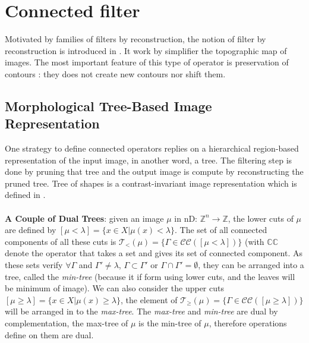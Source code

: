 \section{Connected filter}
Motivated by families of filters by reconstruction, the notion of filter by reconstruction is introduced in \cite{Salembier95flatzones} \cite{Serra1993}. It work by simplifier the topographic map of images. The most important feature of this type of operator is preservation of contours \cite{Salembier2009}: they does not create new contours nor shift them.
\subsection{Morphological Tree-Based Image Representation}
One strategy to define connected operators replies on a hierarchical region-based representation of the input image, in another word, a tree. The filtering step is done by pruning that tree and the output image is compute by reconstructing the pruned tree.  Tree of shapes is a contrast-invariant image representation which is defined in \cite{Monasse.2000}.
\paragraph{} \textbf{A Couple of Dual Trees}: given an image $\mu $ in nD: $\mathbb{Z}^{n} \rightarrow \mathbb{Z} $, the lower cuts of $\mu$ are defined by 
	$[\mu < \lambda] =\lbrace x \in X \vert \mu (x) < \lambda \rbrace $. The set of all connected components of all these cuts is $ \mathcal{T}_< (\mu) =\lbrace \Gamma \in \mathcal{C}\mathcal{C}([\mu < \lambda]) \rbrace $ (with $\mathbb{C}\mathbb{C}$ denote the operator that takes a set and gives its set of connected component. As these sets verify $\forall \Gamma$ and $\Gamma ' \neq \lambda$, $\Gamma \subset \Gamma ' $ or $\Gamma \cap \Gamma '= \emptyset$, they can be arranged into a tree, called the \textit{min-tree} (because it if form using lower cuts, and the leaves will be minimum of image). We can also consider the upper cuts $[\mu \geq \lambda] =\lbrace x \in X \vert \mu (x) \geq \lambda \rbrace $, the element of $ \mathcal{T}_\geq (\mu) =\lbrace \Gamma \in \mathcal{C}\mathcal{C}([\mu \geq \lambda]) \rbrace $ will be arranged in to the \textit{max-tree}. The \textit{max-tree} and \textit{min-tree} are dual by complementation, the max-tree of $\mu$ is the min-tree of $ \mu$, therefore operations define on them are dual.
	
